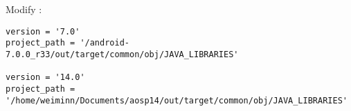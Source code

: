 Modify :
\begin{lstlisting}
version = '7.0'
project_path = '/android-7.0.0_r33/out/target/common/obj/JAVA_LIBRARIES'

version = '14.0'
project_path = '/home/weiminn/Documents/aosp14/out/target/common/obj/JAVA_LIBRARIES'
\end{lstlisting}
















